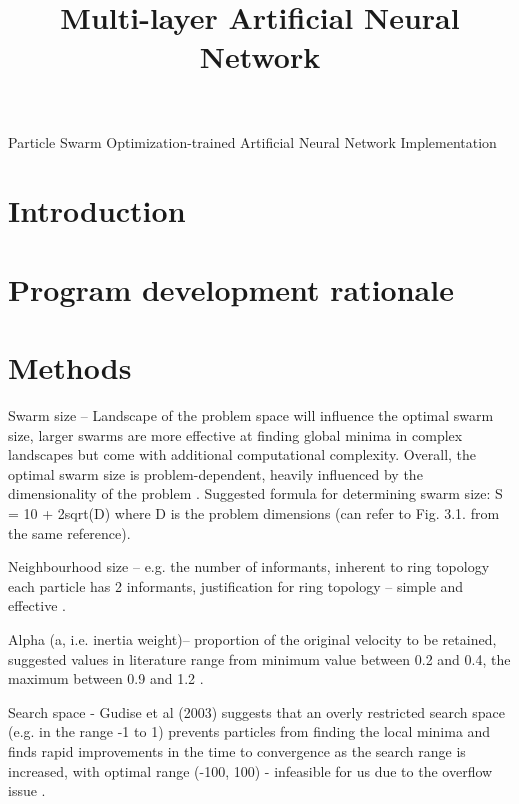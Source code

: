 \documentclass[12pt]{article}
\begin{document}
\title{Multi-layer Artificial Neural Network}

\begin{center}
  \Large{Particle Swarm Optimization-trained Artificial Neural Network Implementation}
\end{center}

\vspace{-2em}
\section{Introduction}


\vspace{-1.5em}
\section{Program development rationale}


\vspace{-1.5em}
\section{Methods}


Swarm size – Landscape of the problem space will influence the optimal swarm size, larger swarms are more effective at finding global minima in complex landscapes but come with additional computational complexity. Overall, the optimal swarm size is problem-dependent, heavily influenced by the dimensionality of the problem \cite{Razee}. Suggested formula for determining swarm size: S = 10 + 2sqrt(D) where D is the problem dimensions (can refer to Fig. 3.1. from the same reference)\cite{Clerc}.

Neighbourhood size – e.g. the number of informants, inherent to ring topology each particle has 2 informants, justification for ring topology – simple and effective \cite{Clerc}. 

Alpha (a, i.e. inertia weight)– proportion of the original velocity to be retained, suggested values in literature range from minimum value between 0.2 and 0.4, the maximum between 0.9 and 1.2 \cite{Razee} \cite{Gudise}.

Search space - Gudise et al (2003) suggests that an overly restricted search space (e.g. in the range -1 to 1) prevents particles from finding the local minima and finds rapid improvements in the time to convergence as the search range is increased, with  optimal range (-100, 100) - infeasible for us due to the overflow issue \cite{Gudise}.
\end{document}
